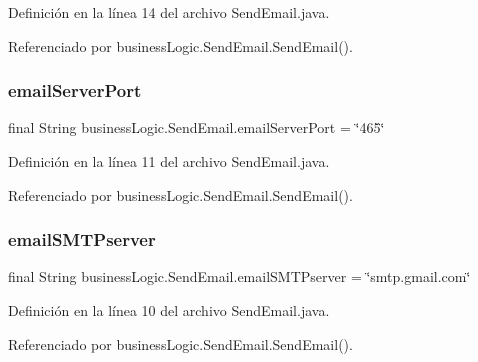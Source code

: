 Definición en la línea 14 del archivo Send\+Email.\+java.



Referenciado por business\+Logic.\+Send\+Email.\+Send\+Email().

\mbox{\label{classbusiness_logic_1_1_send_email_a1c99e22d5e9634a278914e9183c644a9}} 
\subsubsection{\texorpdfstring{emailServerPort}{emailServerPort}}
{\footnotesize\ttfamily final String business\+Logic.\+Send\+Email.\+email\+Server\+Port = \char`\"{}465\char`\"{}\hspace{0.3cm}{\ttfamily [package]}}



Definición en la línea 11 del archivo Send\+Email.\+java.



Referenciado por business\+Logic.\+Send\+Email.\+Send\+Email().

\mbox{\label{classbusiness_logic_1_1_send_email_a1c140265f179e199fc4d20fb3ebc81b6}} 
\subsubsection{\texorpdfstring{emailSMTPserver}{emailSMTPserver}}
{\footnotesize\ttfamily final String business\+Logic.\+Send\+Email.\+email\+S\+M\+T\+Pserver = \char`\"{}smtp.\+gmail.\+com\char`\"{}\hspace{0.3cm}{\ttfamily [package]}}



Definición en la línea 10 del archivo Send\+Email.\+java.



Referenciado por business\+Logic.\+Send\+Email.\+Send\+Email().

\mbox{\label{classbusiness_logic_1_1_send_email_ae03ffb4b828745d6f4cec012064760fe}} 

